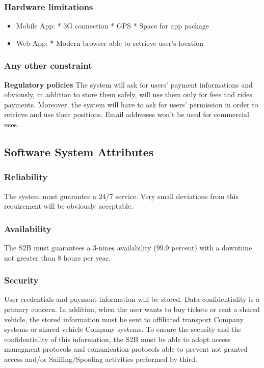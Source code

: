 	\subsubsection{Hardware limitations}
		\begin{itemize}
		\item Mobile App: \newline
			* 3G connection\newline
			* GPS\newline
			* Space for app package
		\item Web App: \newline
			* Modern browser able to retrieve user's location
		\end{itemize}
	
	\subsubsection{Any other constraint}
\textbf{Regulatory policies}\newline
	The system will ask for users' payment informations and obviously, in addition to store them
	safely, will use them only for fees and rides payments.
	Moreover, the system will have to ask for users' permission in order to retrieve and use their
	positions.
	Email addresses won't be used for commercial uses.
\subsection{Software System Attributes} 
	\subsubsection{Reliability}
	The system must guarantee a 24/7 service. Very small deviations from this requirement will be
	obviously acceptable.
	\subsubsection{Availability}
	The S2B must guarantees a 3-nines availability (99.9 percent) with a downtime not greater than 8 hours per year.
	\subsubsection{Security}
User credentials and payment information will be stored. Data confidentiality is a primary concern.
In addition, when the user wants to buy tickets or rent a shared vehicle, the stored information must be sent to affiliated  transport Company systems or shared vehicle Company  systems. To ensure the security and the confidentiality of this information, the S2B must be able to adopt  access managment protocols and comunication protocols able to prevent not granted access and/or Sniffing/Spoofing activities performed by third.
	
